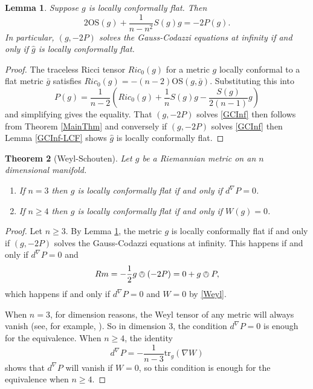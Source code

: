 \documentclass{amsart}
\newcommand{\tr}{\mathrm{tr}}
\newtheorem{thm}{Theorem}[section]
\newtheorem{lem}[thm]{Lemma}
\begin{document}
\begin{lem}
\label{SchoutenSolves}
Suppose $g$ is locally conformally flat. Then 
\[
2\mathrm{OS}(g) + \frac{1}{n-n^2}S(g)g = -2 P(g). 
\]
In particular, $(g,-2P)$ solves the Gauss-Codazzi equations at infinity if and only if $\hat{g}$ is locally conformally flat. 
\end{lem}

\begin{proof}
The traceless Ricci tensor $Ric_0(g)$ for a metric $g$ locally conformal to a flat metric $\bar{g}$ satisfies $Ric_0(g) = -(n-2)\mathrm{OS}(g,\bar{g})$.
Substituting this into
\[
P(g) = \frac{1}{n-2}\left( Ric_0(g) + \frac{1}{n}S(g)g - \frac{S(g)}{2(n-1)} g \right)
\]
and simplifying gives the equality.
That $(g,-2P)$ solves \ref{GCInf} then follows from Theorem \ref{MainThm} and conversely if $(g,-2P)$ solves \ref{GCInf} then Lemma \ref{GCInf-LCF} shows $\hat{g}$ is locally conformally flat. 
\end{proof}

\begin{thm}[Weyl-Schouten]
Let $g$ be a Riemannian metric on an $n$ dimensional manifold.

\begin{enumerate}
\item If $n = 3$ then $g$ is locally conformally flat if and only if $d^\nabla P = 0$.

\item If $n \geq 4$ then $g$ is locally conformally flat if and only if $W(g) = 0$.

\end{enumerate}
\end{thm}

\begin{proof}
Let $n \geq 3$. 
By Lemma \ref{SchoutenSolves}, the metric $g$ is locally conformally flat if and only if $(g,-2P)$ solves the Gauss-Codazzi equations at infinity.
This happens if and only if $d^{\nabla}P = 0$ and 
\[
Rm = -\frac{1}{2}g\owedge (-2P) = 0 + g \owedge P,
\]
which happens if and only if $d^\nabla P = 0$ and $W = 0$ by \eqref{Weyl}.

When $n = 3$, for dimension reasons, the Weyl tensor of any metric will always vanish (see, for example, \cite{Lee2018}).
So in dimension 3, the condition $d^\nabla P = 0$ is enough for the equivalence.
When $n \geq 4$, the identity
\[
d^\nabla P = -\frac{1}{n-3}\tr_g(\nabla W)
\]
shows that $d^\nabla P$ will vanish if $W=0$, so this condition is enough for the equivalence when $n\geq4$.
\end{proof}






 
\end{document}

